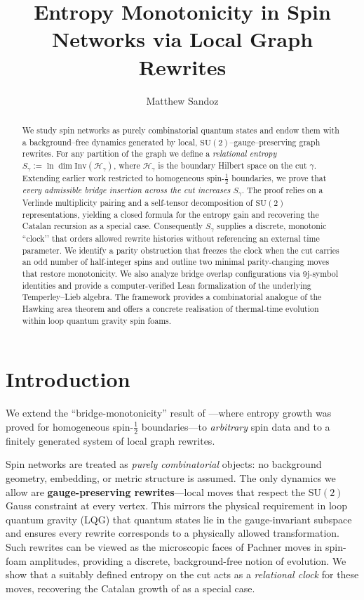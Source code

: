 \documentclass[11pt]{article}
\title{Entropy Monotonicity in Spin Networks via Local Graph Rewrites}
\author{Matthew Sandoz}
\newcommand{\SU}{\mathrm{SU}(2)}
\newcommand{\Inv}{\mathrm{Inv}}
\begin{document}
\maketitle

\begin{abstract}
  We study spin networks as purely combinatorial quantum states and endow
  them with a background--free dynamics generated by local,
  $\mathrm{SU}(2)$--gauge--preserving graph rewrites.  For any partition of
  the graph we define a \emph{relational entropy}
  $S_{\gamma}:=\ln\!\dim\!\Inv(\mathcal H_\gamma)$, where
  $\mathcal H_\gamma$ is the boundary Hilbert space on the cut
  $\gamma$.  Extending earlier work restricted to homogeneous
  spin-$\tfrac12$ boundaries, we prove that \emph{every admissible bridge
  insertion across the cut increases $S_{\gamma}$}.  The proof relies on a
  Verlinde multiplicity pairing and a self-tensor decomposition of
  $\mathrm{SU}(2)$ representations, yielding a closed formula for the
  entropy gain and recovering the Catalan recursion as a special case.
  Consequently $S_{\gamma}$ supplies a discrete, monotonic “clock’’ that
  orders allowed rewrite histories without referencing an external time
  parameter.  We identify a parity obstruction that freezes the clock when
  the cut carries an odd number of half-integer spins and outline two
  minimal parity-changing moves that restore monotonicity. We also analyze
  bridge overlap configurations via 9j-symbol identities and provide a
  computer-verified Lean formalization of the underlying Temperley--Lieb algebra.  The framework
  provides a combinatorial analogue of the Hawking area theorem and offers
  a concrete realisation of thermal-time evolution within loop quantum
  gravity spin foams.
\end{abstract}

\tableofcontents


\section{Introduction} We extend the ``bridge-monotonicity'' result of \cite{SandozBridgeMonotonicity2025}—where entropy growth was proved for homogeneous spin-$\tfrac12$ boundaries—to \emph{arbitrary} spin data and to a finitely generated system of local graph rewrites.

Spin networks are treated as \emph{purely combinatorial} objects: no background geometry, embedding, or metric structure is assumed. The only dynamics we allow are \textbf{gauge-preserving rewrites}—local moves that respect the $\SU$ Gauss constraint at every vertex. This mirrors the physical requirement in loop quantum gravity (LQG) that quantum states lie in the gauge-invariant subspace and ensures every rewrite corresponds to a physically allowed transformation. Such rewrites can be viewed as the microscopic faces of Pachner moves in spin-foam amplitudes, providing a discrete, background-free notion of evolution. We show that a suitably defined entropy on the cut acts as a \emph{relational clock} for these moves, recovering the Catalan growth of \cite{SandozBridgeMonotonicity2025} as a special case.
\end{document}
